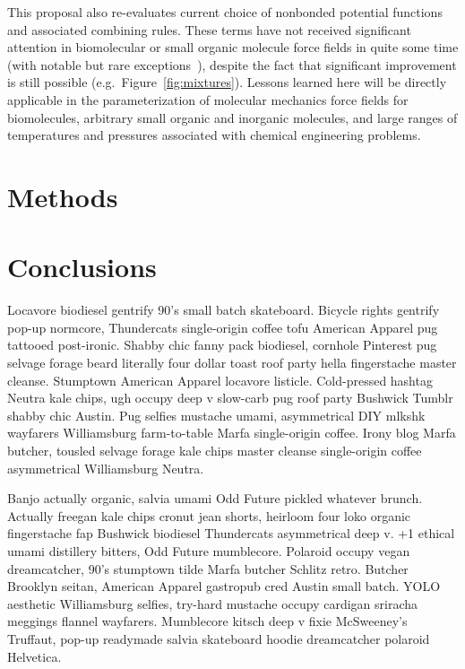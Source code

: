 \documentclass[aps,pre,twocolumn,nofootinbib,superscriptaddress,linenumbers]{revtex4-1}
\begin{document}
This proposal also re-evaluates current choice of nonbonded potential functions and associated combining rules.
These terms have not received significant attention in biomolecular or small organic molecule force fields in quite some time (with notable but rare exceptions~\cite{ponder-case:adv-prot-chem:2003:force-fields-review}), despite the fact that significant improvement is still possible (e.g.~Figure~\ref{fig:mixtures}).
Lessons learned here will be directly applicable in the parameterization of molecular mechanics force fields for biomolecules, arbitrary small organic and inorganic molecules, and large ranges of temperatures and pressures associated with chemical engineering problems.




\section{Methods}
\label{section:methods}



\section{Conclusions}

Locavore biodiesel gentrify 90's small batch skateboard. Bicycle rights gentrify pop-up normcore, Thundercats single-origin coffee tofu American Apparel pug tattooed post-ironic. Shabby chic fanny pack biodiesel, cornhole Pinterest pug selvage forage beard literally four dollar toast roof party hella fingerstache master cleanse. Stumptown American Apparel locavore listicle. Cold-pressed hashtag Neutra kale chips, ugh occupy deep v slow-carb pug roof party Bushwick Tumblr shabby chic Austin. Pug selfies mustache umami, asymmetrical DIY mlkshk wayfarers Williamsburg farm-to-table Marfa single-origin coffee. Irony blog Marfa butcher, tousled selvage forage kale chips master cleanse single-origin coffee asymmetrical Williamsburg Neutra.

Banjo actually organic, salvia umami Odd Future pickled whatever brunch. Actually freegan kale chips cronut jean shorts, heirloom four loko organic fingerstache fap Bushwick biodiesel Thundercats asymmetrical deep v. +1 ethical umami distillery bitters, Odd Future mumblecore. Polaroid occupy vegan dreamcatcher, 90's stumptown tilde Marfa butcher Schlitz retro. Butcher Brooklyn seitan, American Apparel gastropub cred Austin small batch. YOLO aesthetic Williamsburg selfies, try-hard mustache occupy cardigan sriracha meggings flannel wayfarers. Mumblecore kitsch deep v fixie McSweeney's Truffaut, pop-up readymade salvia skateboard hoodie dreamcatcher polaroid Helvetica.
\end{document}
